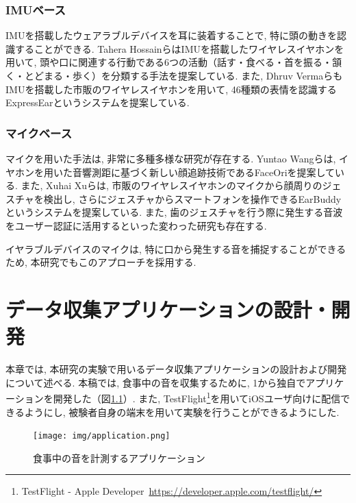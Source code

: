 \subsection{IMUベース}

IMUを搭載したウェアラブルデバイスを耳に装着することで, 特に頭の動きを認識することができる. Tahera HossainらはIMUを搭載したワイヤレスイヤホンを用いて, 頭や口に関連する行動である6つの活動（話す・食べる・首を振る・頷く・とどまる・歩く）を分類する手法を提案している\cite{10.1145/3341162.3343822}. また, Dhruv VermaらもIMUを搭載した市販のワイヤレスイヤホンを用いて, 46種類の表情を認識するExpressEarというシステムを提案している\cite{10.1145/3478085}.

\subsection{マイクベース}

マイクを用いた手法は, 非常に多種多様な研究が存在する. Yuntao Wangらは, イヤホンを用いた音響測距に基づく新しい顔追跡技術であるFaceOriを提案している\cite{10.1145/3491102.3517698}. また, Xuhai Xuらは, 市販のワイヤレスイヤホンのマイクから顔周りのジェスチャを検出し, さらにジェスチャからスマートフォンを操作できるEarBuddyというシステムを提案している\cite{10.1145/3313831.3376836}. また, 歯のジェスチャを行う際に発生する音波をユーザー認証に活用するといった変わった研究も存在する\cite{10.1145/3460120.3485340}.

イヤラブルデバイスのマイクは, 特に口から発生する音を捕捉することができるため, 本研究でもこのアプローチを採用する.

\chapter{データ収集アプリケーションの設計・開発}

本章では, 本研究の実験で用いるデータ収集アプリケーションの設計および開発について述べる. 本稿では, 食事中の音を収集するために, 1から独自でアプリケーションを開発した（図\ref{fig:application}）. また, TestFlight\footnote{TestFlight - Apple Developer~\url{https://developer.apple.com/testflight/}}を用いてiOSユーザ向けに配信できるようにし, 被験者自身の端末を用いて実験を行うことができるようにした.

\begin{figure}[t]
    \begin{center}
        \texttt{[image: img/application.png]}
        \caption{食事中の音を計測するアプリケーション}
        \label{fig:application}
    \end{center}
\end{figure}

